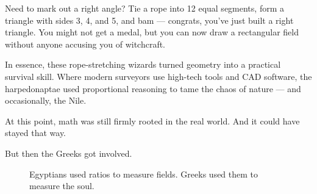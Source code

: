 Need to mark out a right angle? Tie a rope into 12 equal segments, form a triangle with sides 3, 4, and 5, and bam --- congrats, you’ve just built a right triangle. You might not get a medal, but you can now draw a rectangular field without anyone accusing you of witchcraft. 

In essence, these rope-stretching wizards turned geometry into a practical survival skill. Where modern surveyors use high-tech tools and CAD software, the harpedonaptae used proportional reasoning to tame the chaos of nature --- and occasionally, the Nile.



At this point, math was still firmly rooted in the real world. And it could have stayed that way.  

But then the Greeks got involved.  

\begin{figure}[H]
\centering
{}
\caption{Egyptians used ratios to measure fields. Greeks used them to measure the soul.}
\end{figure}